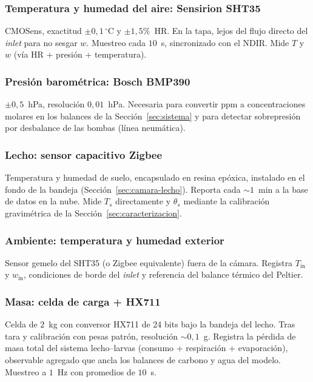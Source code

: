 \subsubsection{Temperatura y humedad del aire: Sensirion SHT35}

CMOSens, exactitud $\pm 0{,}1\,^\circ$C y $\pm 1{,}5\%$~HR. En la tapa, lejos
del flujo directo del \emph{inlet} para no sesgar $w$. Muestreo cada $10$~s,
sincronizado con el NDIR. Mide $T$ y $w$ (vía HR + presión + temperatura).

\subsubsection{Presión barométrica: Bosch BMP390}

$\pm 0{,}5$~hPa, resolución $0{,}01$~hPa. Necesaria para convertir ppm a
concentraciones molares en los balances de la Sección~\ref{sec:sistema} y para
detectar sobrepresión por desbalance de las bombas (línea neumática).

\subsubsection{Lecho: sensor capacitivo Zigbee}

Temperatura y humedad de suelo, encapsulado en resina epóxica, instalado en el
fondo de la bandeja (Sección~\ref{sec:camara-lecho}). Reporta cada $\sim 1$~min
a la base de datos en la nube. Mide $T_s$ directamente y $\theta_s$ mediante
la calibración gravimétrica de la Sección~\ref{sec:caracterizacion}.

\subsubsection{Ambiente: temperatura y humedad exterior}

Sensor gemelo del SHT35 (o Zigbee equivalente) fuera de la cámara. Registra
$T_{\mathrm{in}}$ y $w_{\mathrm{in}}$, condiciones de borde del \emph{inlet}
y referencia del balance térmico del Peltier.

\subsubsection{Masa: celda de carga + HX711}

Celda de $2$~kg con conversor HX711 de 24 bits bajo la bandeja del lecho.
Tras tara y calibración con pesas patrón, resolución $\sim 0{,}1$~g.
Registra la pérdida de masa total del sistema lecho--larvas (consumo +
respiración + evaporación), observable agregado que ancla los balances de
carbono y agua del modelo. Muestreo a $1$~Hz con promedios de $10$~s.

